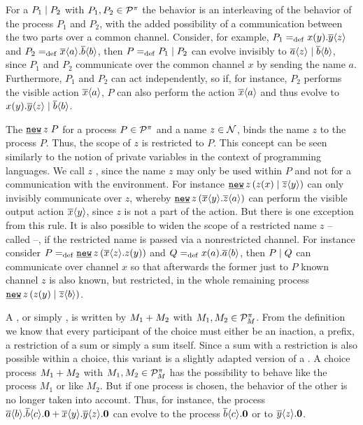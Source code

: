 For a  $P_1 \mid P_2$ with $P_1,P_2\in\mathcal P^{\pi}$ the behavior is an interleaving of the behavior of the process $P_1$ and $P_2$, with the added possibility of a communication between the two parts over a common channel. Consider, for example, $P_1=_{\mathrm{def}}x(y).\overline{y}\langle z\rangle$ and $P_2=_{\mathrm{def}}\overline{x}\langle a\rangle.\overline{b}\langle b\rangle$, then $P=_{\mathrm{def}}P_1 \mid P_2$ can evolve invisibly to $\overline{a}\langle z\rangle \mid \overline{b}\langle b\rangle$, since $P_1$ and $P_2$ communicate over the common channel $x$ by sending the name $a$. Furthermore, $P_1$ and $P_2$ can act independently, so if, for instance, $P_2$ performs the visible action $\overline{x}\langle a\rangle$, $P$ can also perform the action $\overline{x}\langle a\rangle$ and thus evolve to $x(y).\overline{y}\langle z\rangle \mid \overline{b}\langle b\rangle$.

The  $\procres{z}{P}$ for a process $P\in\mathcal P^{\pi}$ and a name $z\in\mathcal N$, binds the name $z$ to the process $P$. Thus, the scope of $z$ is restricted to $P$. This concept can be seen similarly to the notion of private variables in the context of programming languages. We call $z$ , since the name $z$ may only be used within $P$ and not for a communication with the environment. For instance $\procres[a]{z}{\procpar{\inp{z}{x}}{\out{z}{y}}}$ can only invisibly communicate over $z$, whereby $\procres[a]{z}{\out{x}{y}.\out{z}{a}}$ can perform the visible output action $\overline{x}\langle y\rangle$, since $z$ is not a part of the action. But there is one exception from this rule. It is also possible to widen the scope of a restricted name $z$ -- called  --, if the restricted name is passed via a nonrestricted channel. For instance consider $P\define\procres[a]{z}{\out{x}{z}.\inp{z}{y}}$ and $Q=_{\mathrm{def}}x(a).\overline{a}\langle b\rangle$, then $P \mid Q$ can communicate over channel $x$ so that afterwards the former just to $P$ known channel $z$ is also known, but restricted, in the whole remaining process $\procres[a]{z}{\procpar{\inp{z}{y}}{\out{z}{b}}}$.

A , or simply , is written by $M_1 + M_2$ with $M_1,M_2\in\mathcal P^{\pi}_{M}$. From the definition we know that every participant of the choice must either be an inaction, a prefix, a restriction of a sum or simply a sum itself. Since a sum with a restriction is also possible within a choice, this variant is a slightly adapted version of a . A choice process $M_1 + M_2$ with $M_1,M_2\in\mathcal P^{\pi}_{M}$ has the possibility to behave like the process $M_1$ or like $M_2$. But if one process is chosen, the behavior of the other is no longer taken into account. Thus, for instance, the process $\overline{a}\langle b\rangle.\overline{b}\langle c\rangle.\mathbf{0} + \overline{x}\langle y\rangle.\overline{y}\langle z\rangle.\mathbf{0}$ can evolve to the process $\overline{b}\langle c\rangle.\mathbf{0}$ or to $\overline{y}\langle z\rangle.\mathbf{0}$.

